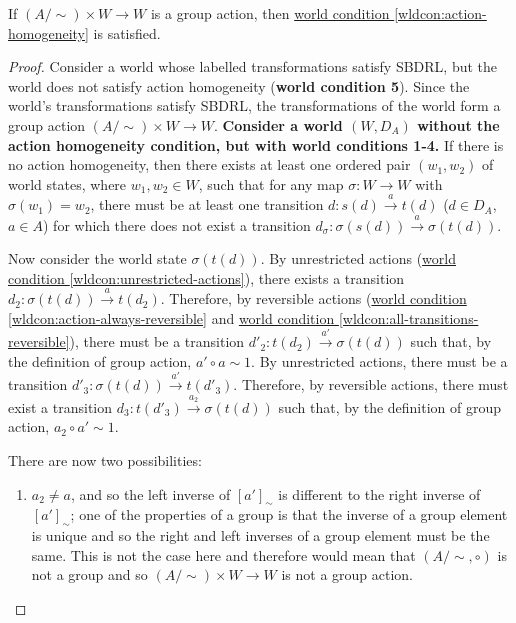\begin{proposition}\label{prp:action-homogeneity-necessary}
    If $(A/\sim) \times W \to W$ is a group action, then \hyperref[wldcon:action-homogeneity]{world condition \ref*{wldcon:action-homogeneity}} is satisfied.
\end{proposition}
\begin{proof}
    Consider a world whose labelled transformations satisfy SBDRL, but the world does not satisfy action homogeneity (\textbf{world condition 5}).
    Since the world's transformations satisfy SBDRL, the transformations of the world form a group action $(A/\sim) \times W \to W$.
    \textbf{Consider a world $(W, D_{A})$ without the action homogeneity condition, but with world conditions 1-4.}
    If there is no action homogeneity, then there exists at least one ordered pair $(w_{1}, w_{2})$ of world states, where $w_{1}, w_{2} \in W$, such that for any map $\sigma: W \to W$ with $\sigma(w_{1})=w_{2}$, there must be at least one transition $d:s(d) \xrightarrow{a} t(d)$ ($d \in D_{A}$, $a \in A$) for which there does not exist a transition $d_{\sigma}:\sigma(s(d)) \xrightarrow{a} \sigma(t(d))$.
    
    Now consider the world state $\sigma(t(d))$.
    By unrestricted actions (\hyperref[wldcon:unrestricted-actions]{world condition \ref*{wldcon:unrestricted-actions}}), there exists a transition $d_{2}: \sigma(t(d)) \xrightarrow{a} t(d_{2})$.
    Therefore, by reversible actions (\hyperref[wldcon:action-always-reversible]{world condition \ref*{wldcon:action-always-reversible}} and \hyperref[wldcon:all-transitions-reversible]{world condition \ref*{wldcon:all-transitions-reversible}}), there must be a transition $d'_{2}: t(d_{2}) \xrightarrow{a'} \sigma(t(d))$ such that, by the definition of group action, $a' \circ a \sim 1$.
    By unrestricted actions, there must be a transition $d'_{3}: \sigma(t(d)) \xrightarrow{a'} t(d'_{3})$.
    Therefore, by reversible actions, there must exist a transition $d_{3}: t(d'_{3}) \xrightarrow{a_{2}} \sigma(t(d))$ such that, by the definition of group action, $a_{2} \circ a' \sim 1$.
    
    There are now two possibilities:
    \begin{enumerate}
        \item $a_{2} \neq a$, and so the left inverse of $[a']_{\sim}$ is different to the right inverse of $[a']_{\sim}$; one of the properties of a group is that the inverse of a group element is unique and so the right and left inverses of a group element must be the same. This is not the case here and therefore would mean that $(A/\sim, \circ)$ is not a group and so $(A/\sim) \times W \to W$ is not a group action.
        

\end{enumerate}
\end{proof}
